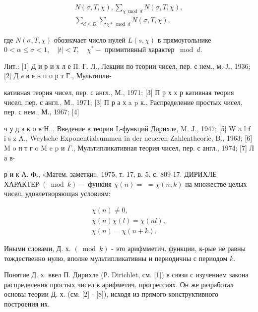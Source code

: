 \documentclass[10pt]{article}
\begin{document}
\[

\begin{gathered}

N(\sigma, T, \chi), \sum_{\chi \bmod d} N(\sigma, T, \chi), \\

\sum_{d \leqslant D} \sum_{\chi * \bmod d} N(\sigma, T, \chi),

\end{gathered}

\]



где $N(\sigma, T, \chi)$ обозначает число нулей $L(s, \chi)$ в прямоугольнике $0<\alpha \leqslant \sigma<1, \quad|t|<T, \quad \chi^{*}-$ примитивный характер $\bmod d$.



Лит.: [1] Д и р и х л е П. Г. Л., Лекции по теории чисел, пер. с нем., м.-Ј., 1936; [2] Д ә в е н п о р т Г., Мультипли-

кативная теория чисел, пер. с англ., М., 1971; [3] П р х х р кативная теория чисел, пер. с англ., М., 1971; [3] П р а х a p к., Распределение простых чисел, пер. с нем., М., 1967; [4]

ч у д а к о в Н.., Введение в теории L-функций Дирихле, M. J., 1947; [5] W a l f i s z A., Weylsche Exponentialsummen in der neueren Zahlentheorie, B., 1963; [6] M o н т г o M e p и $\Gamma$., Мультипликативная теория чисел, пер. с англ., 1974; [7] Л а в-

р и к А. Ф., «Матем. заметки», 1975, т. 17, в. 5, с. 809-17. ДИРИХЛЕ ХАРАКТЕР $(\bmod k)-$ функіия $\chi(n)=$ $=\chi(n ; k)$ на множестве целых чисел, удовлетворяющая условиям:



\[

\begin{gathered}

\chi(n) \neq 0, \\

\chi(n) \chi(l)=\chi(n l), \\

\chi(n)=\chi(n+k) .

\end{gathered}

\]



Иными словами, Д. х. $(\bmod k)$ - это арифмметич. функции, к-рые не равны тождественно нулю, вполне мультипликативны и периодичны с периодом $k$.



Понятие Д. х. ввел П. Дирихле (Р. Dirichlet, см. [1]) в связи с изучением закона распределения простых чисел в арифметич. прогрессиях. Он же разработал основы теории Д. х. (см. [2] - [8]), исходя из прямого конструктивного построения их.
\end{document}

